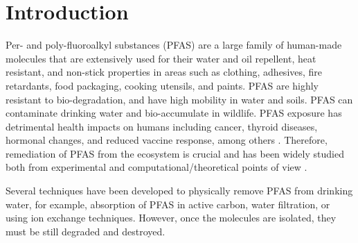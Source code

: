 \documentclass[journal,onecolumn]{IEEEtran}
\begin{document}


\newpage
\section{Introduction}
\label{sec:introduction_and_background}

Per- and poly-fluoroalkyl substances (PFAS) are a large family of human-made molecules that are extensively used for their water and oil repellent, heat resistant, and non-stick properties in areas such as clothing, adhesives, fire retardants, food packaging, cooking utensils, and paints.
PFAS are highly resistant to bio-degradation, and have high mobility in water and soils. 
PFAS can contaminate drinking water \cite{EUSPA2016} and bio-accumulate in wildlife.
PFAS exposure has detrimental health impacts on humans including cancer, thyroid diseases, hormonal changes, and reduced vaccine response, among others \cite{PFAS2016,Looker2013}. 
Therefore, remediation of PFAS from the ecosystem is crucial and has been widely studied both from experimental and computational/theoretical points of view \cite{DOMBROWSKI2018}.

Several techniques have been developed to physically remove PFAS from drinking water, for example, absorption of PFAS in active carbon, water filtration, or using ion exchange techniques\cite{RAHMAN2014,Kumarasamy2020,XIAO2017}. However, once the molecules are isolated, they must be still degraded and destroyed. 
\end{document}
